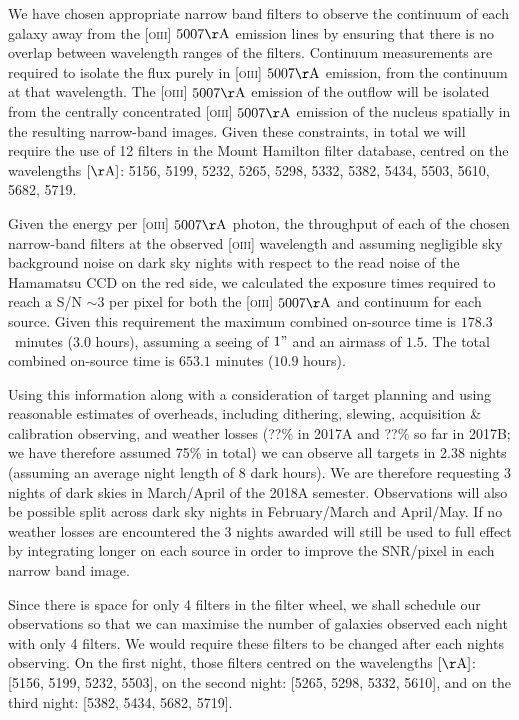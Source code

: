 \documentclass[12pt]{article}
\begin{document}
We have chosen appropriate narrow band filters to observe the continuum of each galaxy away from the \textsc{[oiii]} $5007\rm{\AA}$ emission lines by ensuring that there is no overlap between wavelength ranges of the filters.  Continuum measurements are required to isolate the flux purely in \textsc{[oiii]} $5007\rm{\AA}$ emission, from the continuum at that wavelength. The \textsc{[oiii]} $5007\rm{\AA}$ emission of the outflow will be isolated from the centrally concentrated \textsc{[oiii]} $5007\rm{\AA}$ emission of the nucleus spatially in the resulting narrow-band images. Given these constraints, in total we will require the use of 12 filters in the Mount Hamilton filter database, centred on the wavelengths $[\rm{\AA}]$: 5156, 5199, 5232, 5265, 5298, 5332, 5382, 5434, 5503, 5610, 5682, 5719. 

\vspace{0.25em}

Given the energy per \textsc{[oiii]} $5007\rm{\AA}$ photon, the throughput of each of the chosen narrow-band filters at the observed \textsc{[oiii]} wavelength and assuming negligible sky background noise on dark sky nights with respect to the read noise of the Hamamatsu CCD on the red side, we calculated the exposure times required to reach a S/N $\sim 3$ per pixel for both the \textsc{[oiii]} $5007\rm{\AA}$ and continuum for each source. Given this requirement the maximum combined on-source time is $178.3$~minutes ($3.0$ hours), assuming a seeing of $1"$ and an airmass of $1.5$. The total combined on-source time is $653.1$ minutes ($10.9$ hours).  
\vspace{0.25em}

Using this information along with a consideration of target planning and using reasonable estimates of overheads, including dithering, slewing, acquisition \& calibration observing, and weather losses (??\% in 2017A and ??\% so far in 2017B; we have therefore assumed 75\% in total) we can observe all targets in 2.38 nights (assuming an average night length of $8$ dark hours). We are therefore requesting 3 nights of dark skies in March/April of the 2018A semester. Observations will also be possible split across dark sky nights in February/March and April/May. If no weather losses are encountered the $3$ nights awarded will still be used to full effect by integrating longer on each source in order to improve the SNR/pixel in each narrow band image. 

Since there is space for only 4 filters in the filter wheel, we shall schedule our observations so that we can maximise the number of galaxies observed each night with only 4 filters. We would require these filters to be changed after each nights observing.  On the first night, those filters centred on the wavelengths $[\rm{\AA}]$: [5156, 5199, 5232, 5503], on the second night: [5265, 5298, 5332, 5610], and on the third night: [5382, 5434, 5682, 5719]. 
\end{document}
